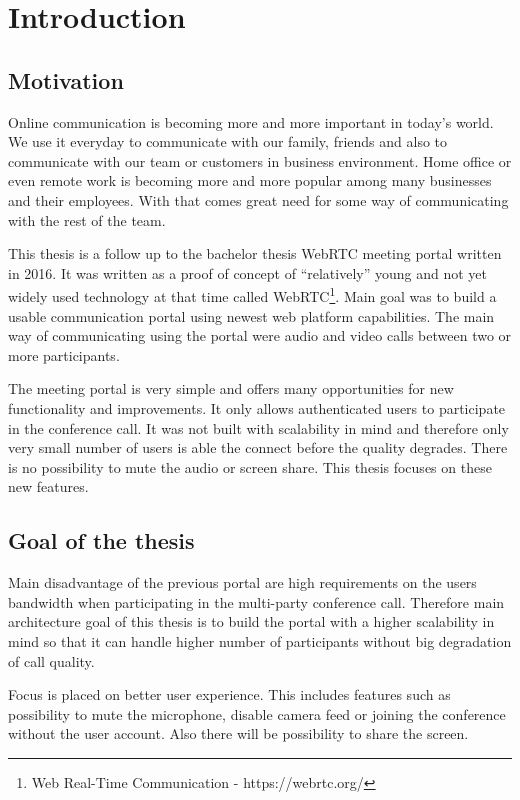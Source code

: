 \documentclass[
  digital, %
  table,   %
  lof,     %
  nolot,     %
]{fithesis3}
\begin{document}
\chapter{Introduction}
\section{Motivation}
Online communication is becoming more and more important in today’s world. We use it everyday to communicate with our family, friends and also to communicate with our team or customers in business environment. Home office or even remote work is becoming more and more popular among many businesses and their employees. With that comes great need for some way of communicating with the rest of the team.

This thesis is a follow up to the bachelor thesis WebRTC meeting portal \cite{bachelorThesis} written in 2016. It was written as a proof of concept of “relatively” young and not yet widely used technology at that time called WebRTC\footnote{Web Real-Time Communication - https://webrtc.org/
}. Main goal was to build a usable communication portal using newest web platform capabilities. The main way of communicating using the portal were audio and video calls between two or more participants.

The meeting portal is very simple and offers many opportunities for new functionality and improvements. It only allows authenticated users to participate in the conference call. It was not built with scalability in mind and therefore only very small number of users is able the connect before the quality degrades. There is no possibility to mute the audio or screen share. This thesis focuses on these new features. 

\section{Goal of the thesis}
Main disadvantage of the previous portal are high requirements on the users bandwidth when participating in the multi-party conference call. Therefore main architecture goal of this thesis is to build the portal with a higher scalability in mind so that it can handle higher number of participants without big degradation of call quality.

Focus is placed on better user experience. This includes features such as possibility to mute the microphone, disable camera feed or joining  the conference without the user account. Also there will be possibility to share the screen.
\end{document}
